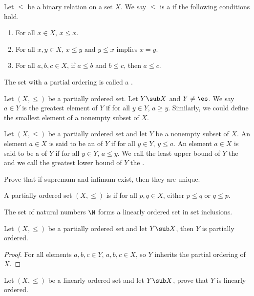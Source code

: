 \documentclass[10pt]{article}
\begin{document}
\begin{definition}
    Let $\le$ be a binary relation on a set $X$. We say $\le$ is a  if the following conditions hold.
    \begin{enumerate}
        \item For all $x\in X$, $x\le x$.
        \item For all $x,y\in X$, $x\le y$ and $y\le x$ implies $x=y$.
        \item For all $a,b,c\in X$, if $a\le b$ and $b\le c$, then $a\le c$.
    \end{enumerate}
    The set with a partial ordering is called a .
\end{definition}
\par
Let $(X,\le)$ be a partially ordered set. Let $Y\sub X$ and $Y\ne\es$. We say $a\in Y$ is the greatest element of $Y$ if for all $y\in Y$, $a\ge y$. Similarly, we could define the smallest element of a nonempty subset of $X$.
\begin{definition}
    Let $(X,\le)$ be a partially ordered set and let $Y$ be a nonempty subset of $X$. An element $a\in X$ is said to be an  of $Y$ if for all $y\in Y$, $y\le a$. An element $a\in X$ is said to be a  of $Y$ if for all $y\in Y$, $a\le y$. We call the least upper bound of $Y$ the  and we call the greatest lower bound of $Y$ the .
\end{definition}
\begin{problem}
    Prove that if supremum and infimum exist, then they are unique.
\end{problem}
\begin{definition}
    A partially ordered set $(X,\le)$ is  if for all $p,q\in X$, either $p\le q$ or $q\le p$.
\end{definition}
\begin{example}
    The set of natural numbers $\N$ forms a linearly ordered set in set inclusions.
\end{example}
\begin{proposition}
    Let $(X,\le)$ be a partially ordered set and let $Y\sub X$, then $Y$ is partially ordered.
\end{proposition}
\begin{proof}
    For all elements $a,b,c\in Y$, $a,b,c\in X$, so $Y$ inherits the partial ordering of $X$.
\end{proof}
\begin{problem}
    Let $(X,\le)$ be a linearly ordered set and let $Y\sub X$, prove that $Y$ is linearly ordered.
\end{problem}
\end{document}
